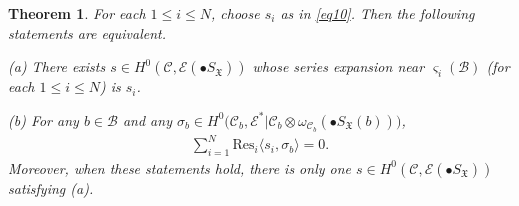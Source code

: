 \documentclass[12pt,a4paper,notitlepage]{report}
\theoremstyle{definition}
\theoremstyle{plain}
\newtheorem{thm}[df]{Theorem}
\newcommand{\fk}{\mathfrak}
\newcommand{\mc}{\mathcal}
\newcommand{\Res}{\mathrm{Res}}
\newcommand{\bk}[1]{\langle {#1}\rangle}
\newcommand{\scr}{\mathscr}
\newcommand{\sgm}{\varsigma}
\newcommand{\SX}{S_{\fk X}}
\numberwithin{equation}{section}
\begin{document}
\begin{thm}\label{lb18}
For each $1\leq i\leq N$, choose $s_i$ as in \eqref{eq10}.  Then the following statements are equivalent.

(a) There exists $s\in H^0(\mc C,\scr E(\bullet\SX))$ whose series expansion near $\sgm_i(\mc B)$ (for each $1\leq i\leq N$) is $s_i$.

(b) For any $b\in\mc B$ and any $\sigma_b\in H^0\big(\mc C_b,\scr E^*|\mc C_b\otimes\omega_{\mc C_b}(\bullet\SX(b))\big)$,
\begin{align}
\sum_{i=1}^N\Res_i\bk{s_i,\sigma_b}=0.
\end{align}
Moreover, when these statements hold, there is only one $s\in H^0(\mc C,\scr E(\bullet\SX))$ satisfying (a).
\end{thm}
\end{document}
